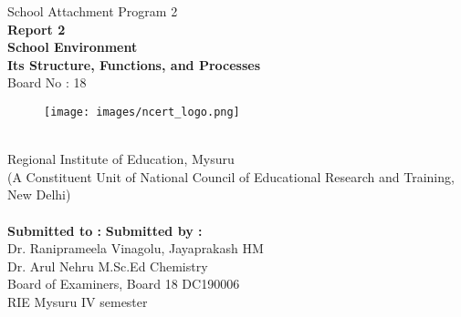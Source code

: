 \begin{center}
    \Large School Attachment Program 2 \\[0.75\baselineskip]
    \Large \textbf{Report 2} \\ [0.75\baselineskip]
    \Huge \textbf{School Environment\\ Its Structure, Functions, and Processes} \\ [0.75\baselineskip]
    \Large Board No : 18\\
\end{center}
\vfill
\begin{figure}[h!]
    \centering
    \texttt{[image: images/ncert\_logo.png]}
\end{figure}

\begin{centering}

\toprule \bottomrule \\[0.5\baselineskip]
\Large Regional Institute of Education, Mysuru\\
\footnotesize (A Constituent Unit of National Council of Educational Research and Training, New Delhi)\\[0.5\baselineskip]
\toprule
\bottomrule \\ [1.5\baselineskip]
\normalsize 
\textbf{Submitted to :}         \hfill \textbf{Submitted by :} \\
Dr. Raniprameela Vinagolu,      \hfill Jayaprakash HM \\
Dr. Arul Nehru                  \hfill M.Sc.Ed Chemistry \\
Board of Examiners, Board 18    \hfill DC190006 \\
RIE Mysuru                      \hfill IV semester \\
\end{centering}

\thispagestyle{empty}